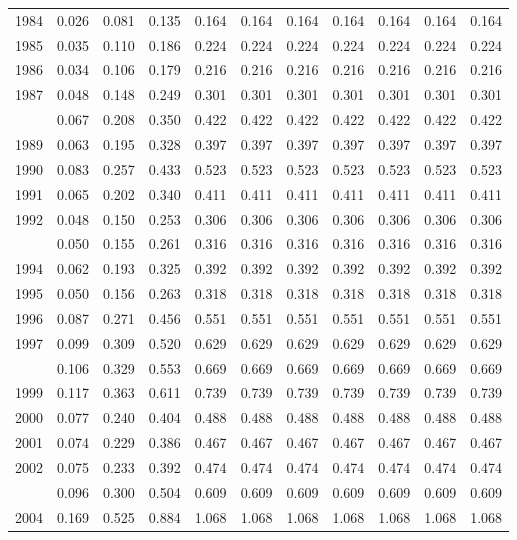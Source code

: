 \documentclass[
]{article}
\begin{document}
\begin{longtable}[t]{lrrrrrrrrrr}
1984 & 0.026 & 0.081 & 0.135 & 0.164 & 0.164 & 0.164 & 0.164 & 0.164 & 0.164 & 0.164\\
1985 & 0.035 & 0.110 & 0.186 & 0.224 & 0.224 & 0.224 & 0.224 & 0.224 & 0.224 & 0.224\\
1986 & 0.034 & 0.106 & 0.179 & 0.216 & 0.216 & 0.216 & 0.216 & 0.216 & 0.216 & 0.216\\
1987 & 0.048 & 0.148 & 0.249 & 0.301 & 0.301 & 0.301 & 0.301 & 0.301 & 0.301 & 0.301\\
\addlinespace
1988 & 0.067 & 0.208 & 0.350 & 0.422 & 0.422 & 0.422 & 0.422 & 0.422 & 0.422 & 0.422\\
1989 & 0.063 & 0.195 & 0.328 & 0.397 & 0.397 & 0.397 & 0.397 & 0.397 & 0.397 & 0.397\\
1990 & 0.083 & 0.257 & 0.433 & 0.523 & 0.523 & 0.523 & 0.523 & 0.523 & 0.523 & 0.523\\
1991 & 0.065 & 0.202 & 0.340 & 0.411 & 0.411 & 0.411 & 0.411 & 0.411 & 0.411 & 0.411\\
1992 & 0.048 & 0.150 & 0.253 & 0.306 & 0.306 & 0.306 & 0.306 & 0.306 & 0.306 & 0.306\\
\addlinespace
1993 & 0.050 & 0.155 & 0.261 & 0.316 & 0.316 & 0.316 & 0.316 & 0.316 & 0.316 & 0.316\\
1994 & 0.062 & 0.193 & 0.325 & 0.392 & 0.392 & 0.392 & 0.392 & 0.392 & 0.392 & 0.392\\
1995 & 0.050 & 0.156 & 0.263 & 0.318 & 0.318 & 0.318 & 0.318 & 0.318 & 0.318 & 0.318\\
1996 & 0.087 & 0.271 & 0.456 & 0.551 & 0.551 & 0.551 & 0.551 & 0.551 & 0.551 & 0.551\\
1997 & 0.099 & 0.309 & 0.520 & 0.629 & 0.629 & 0.629 & 0.629 & 0.629 & 0.629 & 0.629\\
\addlinespace
1998 & 0.106 & 0.329 & 0.553 & 0.669 & 0.669 & 0.669 & 0.669 & 0.669 & 0.669 & 0.669\\
1999 & 0.117 & 0.363 & 0.611 & 0.739 & 0.739 & 0.739 & 0.739 & 0.739 & 0.739 & 0.739\\
2000 & 0.077 & 0.240 & 0.404 & 0.488 & 0.488 & 0.488 & 0.488 & 0.488 & 0.488 & 0.488\\
2001 & 0.074 & 0.229 & 0.386 & 0.467 & 0.467 & 0.467 & 0.467 & 0.467 & 0.467 & 0.467\\
2002 & 0.075 & 0.233 & 0.392 & 0.474 & 0.474 & 0.474 & 0.474 & 0.474 & 0.474 & 0.474\\
\addlinespace
2003 & 0.096 & 0.300 & 0.504 & 0.609 & 0.609 & 0.609 & 0.609 & 0.609 & 0.609 & 0.609\\
2004 & 0.169 & 0.525 & 0.884 & 1.068 & 1.068 & 1.068 & 1.068 & 1.068 & 1.068 & 1.068\\

\end{longtable}
\end{document}
